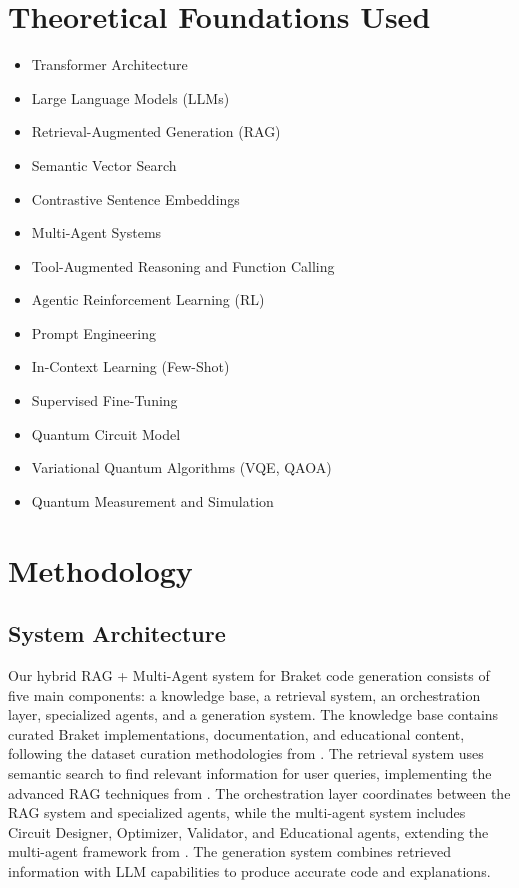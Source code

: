 \documentclass[runningheads]{llncs}
\begin{document}
\section{Theoretical Foundations Used}

\begin{itemize}
\item Transformer Architecture
\item Large Language Models (LLMs)
\item Retrieval-Augmented Generation (RAG)
\item Semantic Vector Search
\item Contrastive Sentence Embeddings
\item Multi-Agent Systems
\item Tool-Augmented Reasoning and Function Calling
\item Agentic Reinforcement Learning (RL)
\item Prompt Engineering
\item In-Context Learning (Few-Shot)
\item Supervised Fine-Tuning
\item Quantum Circuit Model
\item Variational Quantum Algorithms (VQE, QAOA)
\item Quantum Measurement and Simulation
\end{itemize}

\section{Methodology}

\subsection{System Architecture}
Our hybrid RAG + Multi-Agent system for Braket code generation consists of five main components: a knowledge base, a retrieval system, an orchestration layer, specialized agents, and a generation system. The knowledge base contains curated Braket implementations, documentation, and educational content, following the dataset curation methodologies from \cite{basit2025pennylangpioneeringllmbasedquantum}. The retrieval system uses semantic search to find relevant information for user queries, implementing the advanced RAG techniques from \cite{siavash2025modeldrivenquantumcodegeneration}. The orchestration layer coordinates between the RAG system and specialized agents, while the multi-agent system includes Circuit Designer, Optimizer, Validator, and Educational agents, extending the multi-agent framework from \cite{campbell2025enhancingllmbasedquantumcode}. The generation system combines retrieved information with LLM capabilities to produce accurate code and explanations.
\end{document}
